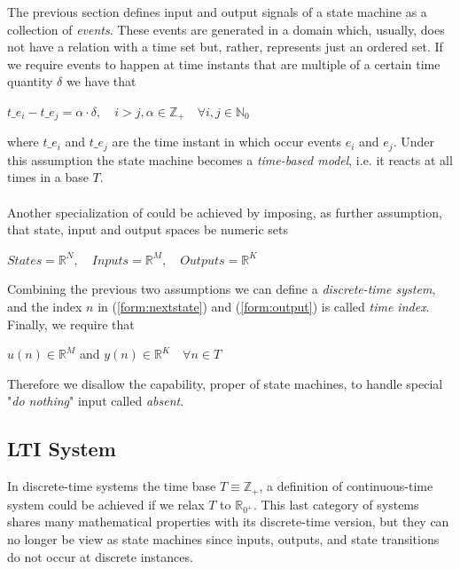 The previous section defines input and output signals of a state machine as a collection of \textit{events}. These events are generated in a domain which, usually, does not have a relation with a time set but, rather, represents just an ordered set. If we require events to happen at time instants that are multiple of a certain time quantity $\delta$ we have that
\begin{center}
$t\_e_{i}-t\_e_{j}=\alpha\cdot\delta,\quad i>j, \alpha \in \mathbb{Z}_{+}\quad \forall i,j \in \mathbb{N}_{0}$
\end{center}
where $t\_e_{i}$ and $t\_e_{j}$ are the time instant in which occur events $e_{i}$ and $e_{j}$. Under this assumption the state machine becomes a \textit{time-based model}, i.e. it reacts at all times in a base $T$.
\paragraph{} Another specialization of could be achieved by imposing, as further assumption, that state, input and output spaces be numeric sets
\begin{center}
$States=\mathbb{R}^{N},\quad Inputs=\mathbb{R}^{M},\quad Outputs=\mathbb{R}^{K}$
\end{center}
Combining the previous two assumptions we can define a \textit{discrete-time system}, and the index $n$ in (\ref{form:nextstate}) and (\ref{form:output}) is called \textit{time index}. Finally, we require that 
\begin{center}
$u(n) \in \mathbb{R}^{M}$ and $y(n) \in \mathbb{R}^{K} \quad \forall n \in T$
\end{center}
Therefore we disallow the capability, proper of state machines, to handle special "\textit{do nothing}" input called \textit{absent}. 

\subsection{LTI System}
\label{ssec:ltisys}

In discrete-time systems the time base $T \equiv \mathbb{Z}_{+}$, a definition of continuous-time system could be achieved if we relax $T$ to $\mathbb{R}_{0^{+}}$. This last category of systems shares many mathematical properties with its discrete-time version, but they can no longer be view as state machines since inputs, outputs, and state transitions do not occur at discrete instances.

